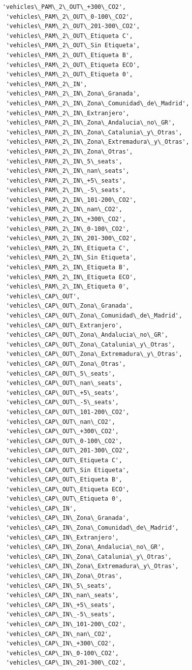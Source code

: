 \documentclass[11pt]{article}
\begin{document}
\begin{Verbatim}[commandchars=\\\{\}]
 'vehicles\_PAM\_2\_OUT\_+300\_CO2',
 'vehicles\_PAM\_2\_OUT\_0-100\_CO2',
 'vehicles\_PAM\_2\_OUT\_201-300\_CO2',
 'vehicles\_PAM\_2\_OUT\_Etiqueta C',
 'vehicles\_PAM\_2\_OUT\_Sin Etiqueta',
 'vehicles\_PAM\_2\_OUT\_Etiqueta B',
 'vehicles\_PAM\_2\_OUT\_Etiqueta ECO',
 'vehicles\_PAM\_2\_OUT\_Etiqueta 0',
 'vehicles\_PAM\_2\_IN',
 'vehicles\_PAM\_2\_IN\_Zona\_Granada',
 'vehicles\_PAM\_2\_IN\_Zona\_Comunidad\_de\_Madrid',
 'vehicles\_PAM\_2\_IN\_Extranjero',
 'vehicles\_PAM\_2\_IN\_Zona\_Andalucia\_no\_GR',
 'vehicles\_PAM\_2\_IN\_Zona\_Catalunia\_y\_Otras',
 'vehicles\_PAM\_2\_IN\_Zona\_Extremadura\_y\_Otras',
 'vehicles\_PAM\_2\_IN\_Zona\_Otras',
 'vehicles\_PAM\_2\_IN\_5\_seats',
 'vehicles\_PAM\_2\_IN\_nan\_seats',
 'vehicles\_PAM\_2\_IN\_+5\_seats',
 'vehicles\_PAM\_2\_IN\_-5\_seats',
 'vehicles\_PAM\_2\_IN\_101-200\_CO2',
 'vehicles\_PAM\_2\_IN\_nan\_CO2',
 'vehicles\_PAM\_2\_IN\_+300\_CO2',
 'vehicles\_PAM\_2\_IN\_0-100\_CO2',
 'vehicles\_PAM\_2\_IN\_201-300\_CO2',
 'vehicles\_PAM\_2\_IN\_Etiqueta C',
 'vehicles\_PAM\_2\_IN\_Sin Etiqueta',
 'vehicles\_PAM\_2\_IN\_Etiqueta B',
 'vehicles\_PAM\_2\_IN\_Etiqueta ECO',
 'vehicles\_PAM\_2\_IN\_Etiqueta 0',
 'vehicles\_CAP\_OUT',
 'vehicles\_CAP\_OUT\_Zona\_Granada',
 'vehicles\_CAP\_OUT\_Zona\_Comunidad\_de\_Madrid',
 'vehicles\_CAP\_OUT\_Extranjero',
 'vehicles\_CAP\_OUT\_Zona\_Andalucia\_no\_GR',
 'vehicles\_CAP\_OUT\_Zona\_Catalunia\_y\_Otras',
 'vehicles\_CAP\_OUT\_Zona\_Extremadura\_y\_Otras',
 'vehicles\_CAP\_OUT\_Zona\_Otras',
 'vehicles\_CAP\_OUT\_5\_seats',
 'vehicles\_CAP\_OUT\_nan\_seats',
 'vehicles\_CAP\_OUT\_+5\_seats',
 'vehicles\_CAP\_OUT\_-5\_seats',
 'vehicles\_CAP\_OUT\_101-200\_CO2',
 'vehicles\_CAP\_OUT\_nan\_CO2',
 'vehicles\_CAP\_OUT\_+300\_CO2',
 'vehicles\_CAP\_OUT\_0-100\_CO2',
 'vehicles\_CAP\_OUT\_201-300\_CO2',
 'vehicles\_CAP\_OUT\_Etiqueta C',
 'vehicles\_CAP\_OUT\_Sin Etiqueta',
 'vehicles\_CAP\_OUT\_Etiqueta B',
 'vehicles\_CAP\_OUT\_Etiqueta ECO',
 'vehicles\_CAP\_OUT\_Etiqueta 0',
 'vehicles\_CAP\_IN',
 'vehicles\_CAP\_IN\_Zona\_Granada',
 'vehicles\_CAP\_IN\_Zona\_Comunidad\_de\_Madrid',
 'vehicles\_CAP\_IN\_Extranjero',
 'vehicles\_CAP\_IN\_Zona\_Andalucia\_no\_GR',
 'vehicles\_CAP\_IN\_Zona\_Catalunia\_y\_Otras',
 'vehicles\_CAP\_IN\_Zona\_Extremadura\_y\_Otras',
 'vehicles\_CAP\_IN\_Zona\_Otras',
 'vehicles\_CAP\_IN\_5\_seats',
 'vehicles\_CAP\_IN\_nan\_seats',
 'vehicles\_CAP\_IN\_+5\_seats',
 'vehicles\_CAP\_IN\_-5\_seats',
 'vehicles\_CAP\_IN\_101-200\_CO2',
 'vehicles\_CAP\_IN\_nan\_CO2',
 'vehicles\_CAP\_IN\_+300\_CO2',
 'vehicles\_CAP\_IN\_0-100\_CO2',
 'vehicles\_CAP\_IN\_201-300\_CO2',

\end{Verbatim}
\end{document}
